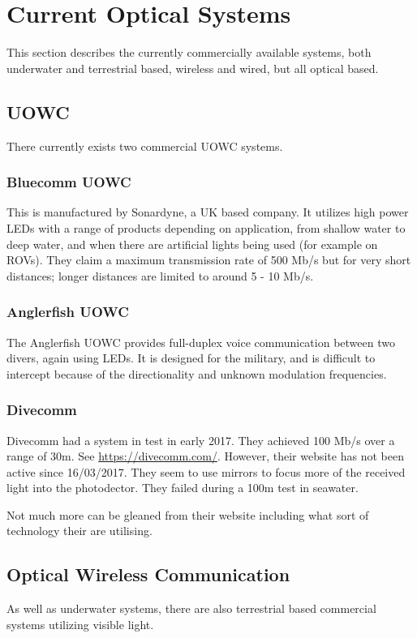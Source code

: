 \section{Current Optical Systems}
This section describes the currently commercially available systems, both
underwater and terrestrial based, wireless and wired, but all optical based.

\subsection{\ac{UOWC}}
There currently exists two commercial \ac{UOWC} systems.

\subsubsection{Bluecomm \ac{UOWC}}
This is manufactured by Sonardyne, a UK based company. It utilizes high power
\ac{LED}s with a range of products depending on application, from shallow water
to deep water, and when there are artificial lights being used (for example on
\ac{ROV}s). They claim a maximum transmission rate of 500 Mb/s but for very
short distances; longer distances are limited to around 5 - 10 Mb/s.

\subsubsection{Anglerfish \ac{UOWC}}
The Anglerfish \ac{UOWC} provides full-duplex voice communication between two
divers, again using \ac{LED}s. It is designed for the military, and is
difficult to intercept because of the directionality and unknown modulation
frequencies.

\subsubsection{Divecomm}
Divecomm had a system in test in early 2017. They achieved 100 Mb/s over
a range of 30m. See \url{https://divecomm.com/}. However, their website has
not been active since 16/03/2017. They seem to use mirrors to focus more of
the received light into the photodector. They failed during a 100m test in
seawater.

Not much more can be gleaned from their website including what sort of
technology their are utilising.

\subsection{Optical Wireless Communication}
As well as underwater systems, there are also terrestrial based commercial
systems utilizing visible light.

